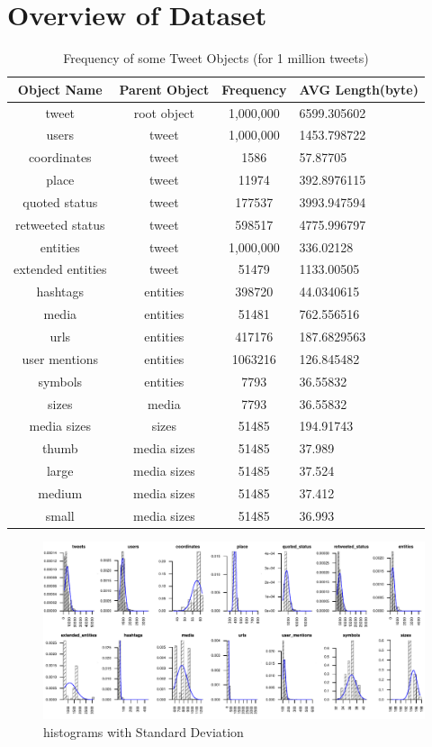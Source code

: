 \section{Overview of Dataset}

\begin{table}
	\centering
	\caption{Frequency of some Tweet Objects  (for 1 million tweets) }
	\begin{adjustbox}{width=\columnwidth,center}	
	
	\begin{tabular}{|c|c|c|l|} \hline
		Object Name &Parent Object &Frequency&AVG Length(byte)\\ \hline
		tweet  & root object& 1,000,000 & 6599.305602\\ \hline
		users & tweet & 1,000,000 & 1453.798722\\ \hline
		coordinates  &tweet& 1586 & 57.87705\\ \hline
		place & tweet & 11974 & 392.8976115\\ \hline
		quoted status  & tweet & 177537 & 3993.947594\\ \hline
		retweeted status  & tweet & 598517 & 4775.996797\\ \hline
		entities  & tweet & 1,000,000 &336.02128\\ \hline
		extended entities  & tweet & 51479 & 1133.00505\\ \hline
		hashtags  & entities & 398720 & 44.0340615\\ \hline
		media  & entities & 51481 & 762.556516\\ \hline
		urls  & entities & 417176 & 187.6829563\\ \hline
		user mentions  & entities & 1063216 & 126.845482\\ \hline
		symbols  & entities & 7793 & 36.55832\\ \hline
		sizes  & media & 7793 & 36.55832\\ \hline
		media sizes  & sizes & 51485 & 194.91743\\ \hline
		thumb  & media sizes & 51485 & 37.989\\ \hline
		large  & media sizes & 51485 & 37.524\\ \hline
		medium  & media sizes & 51485 & 37.412\\ \hline
		small  & media sizes & 51485 & 36.993\\ \hline
		\hline\end{tabular}
		\end{adjustbox}
\end{table}


\begin{figure}
	\centering
	\includegraphics[scale=1]{img/Data_Overview.pdf}
	\caption{histograms with Standard Deviation}
	\label{fig:fly}
\end{figure}